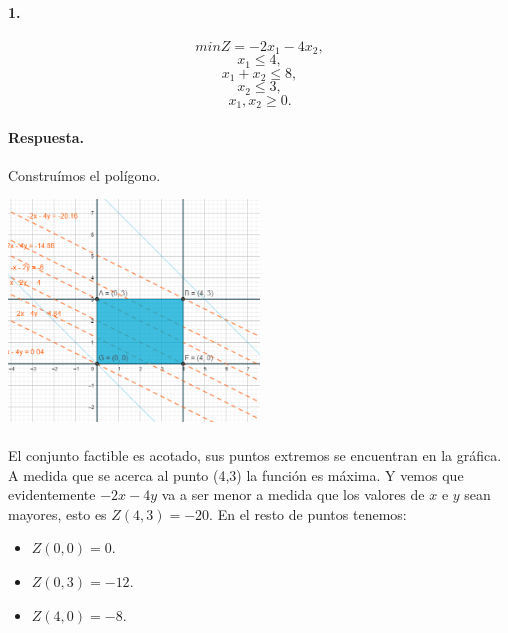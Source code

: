 \documentclass{article}
\begin{document}
	\paragraph{1.}
	$$min Z = -2x_1 - 4x_2,$$
	$$x_1 \leq 4,$$
	$$x_1 + x_2 \leq 8,$$
	$$x_2 \leq 3,$$
	$$x_1, x_2 \geq 0.$$
	\paragraph{Respuesta.} Construímos el polígono.
	\begin{center}
		\includegraphics[width=0.5\textwidth]{4-b}
	\end{center}
	\paragraph{} El conjunto factible es acotado, sus puntos extremos se encuentran en la gráfica. A medida que se acerca al punto (4,3) la función es máxima. Y vemos que evidentemente $-2x - 4y$ va a ser menor a medida que los valores de $x$ e $y$ sean mayores, esto es $Z(4,3) = -20$. En el resto de puntos tenemos:
	\begin{itemize}
		\item $Z(0,0) = 0$.
		\item $Z(0,3) = -12$.
		\item $Z(4,0) = -8$.
	\end{itemize}
	
\end{document}

